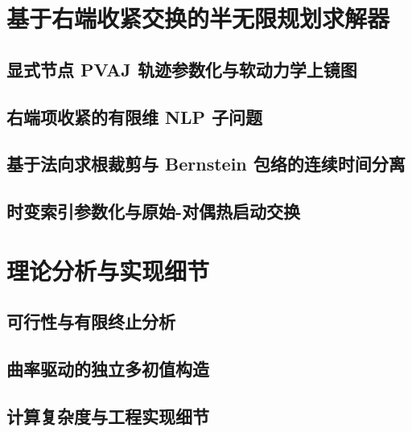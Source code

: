 \documentclass[journal]{IEEEtran}
\begin{document}
\section{基于右端收紧交换的半无限规划求解器}

\subsection{显式节点 PVAJ 轨迹参数化与软动力学上镜图}

\subsection{右端项收紧的有限维 NLP 子问题}

\subsection{基于法向求根裁剪与 Bernstein 包络的连续时间分离}

\subsection{时变索引参数化与原始-对偶热启动交换}

\section{理论分析与实现细节}

\subsection{可行性与有限终止分析}

\subsection{曲率驱动的独立多初值构造}

\subsection{计算复杂度与工程实现细节}
\end{document}
